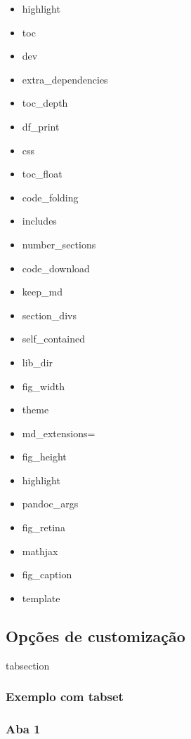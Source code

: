 \documentclass[
]{book}
\providecommand{\tightlist}{%
  \setlength{\itemsep}{0pt}\setlength{\parskip}{0pt}}
\begin{document}
\begin{itemize}
\tightlist
\item
  highlight
\item
  toc
\item
  dev
\item
  extra\_dependencies
\item
  toc\_depth
\item
  df\_print
\item
  css
\item
  toc\_float
\item
  code\_folding
\item
  includes
\item
  number\_sections
\item
  code\_download
\item
  keep\_md
\item
  section\_divs
\item
  self\_contained
\item
  lib\_dir
\item
  fig\_width
\item
  theme
\item
  md\_extensions=
\item
  fig\_height
\item
  highlight
\item
  pandoc\_args
\item
  fig\_retina
\item
  mathjax
\item
  fig\_caption
\item
  template
\end{itemize}

\hypertarget{opuxe7uxf5es-de-customizauxe7uxe3o}{%
\subsection{Opções de customização}\label{opuxe7uxf5es-de-customizauxe7uxe3o}}

tabsection

\hypertarget{exemplo-com-tabset}{%
\subsubsection{Exemplo com tabset}\label{exemplo-com-tabset}}

\hypertarget{aba-1}{%
\subsubsection{Aba 1}\label{aba-1}}
\end{document}
